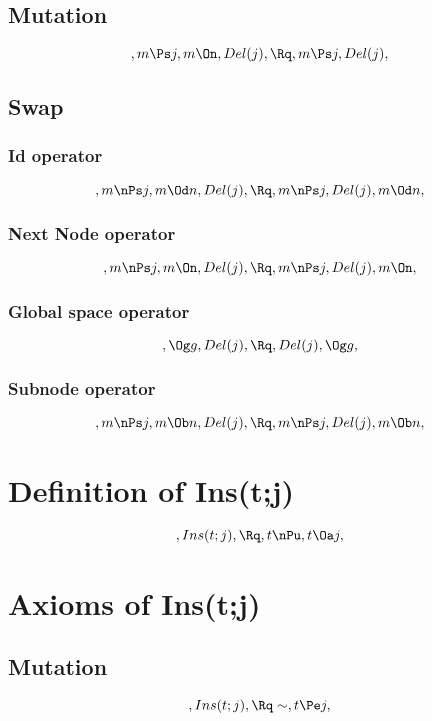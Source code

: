 \subsection{Mutation}
\[, m \Ps j, m \On, Del(j), \Rq , m \Ps j, Del(j), \]



\bigskip
\bigskip
\subsection{Swap}

\subsubsection{Id operator}
\[, m \nPs j, m \Od n, Del(j), \Rq , m \nPs j, Del(j), m \Od n, \]


\subsubsection{Next Node operator}
\[, m \nPs j, m \On, Del(j), \Rq , m \nPs j, Del(j), m \On, \]

\subsubsection{Global space operator}
\[, \Og g, Del(j), \Rq , Del(j), \Og g, \]

\subsubsection{Subnode operator}
\[, m \nPs j, m \Ob n, Del(j), \Rq , m \nPs j, Del(j), m \Ob n, \]







\bigskip
\bigskip
\bigskip
\bigskip
\section{Definition of Ins(t;j)}
\[,Ins(t;j), \Rq , t \nPu, t \Oa j,  \]







\bigskip
\bigskip
\section{Axioms of Ins(t;j)}
\subsection{Mutation}
\[, Ins(t;j),  \Rq \sim, t \Pe j,\]

